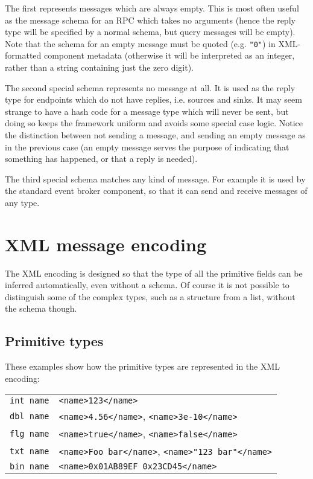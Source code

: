 \documentclass[12pt,a4paper,twoside]{article}
\renewcommand{\_}{\texttt{\symbol{95}}}
\begin{document}
The first represents messages which are always empty.
This is most often useful as the message schema for an RPC which
takes no arguments (hence the reply type will be specified by a normal
schema, but query messages will be empty). Note that the schema
for an empty message must be quoted (e.g. \verb^"0"^) in XML-formatted
component metadata (otherwise it will be interpreted as an integer,
rather than a string containing just the zero digit).

The second special schema represents no message at all. It is used
as the reply type for endpoints which do not have replies, i.e.
sources and sinks. It may seem strange to have a hash code for a
message type which will never be sent, but doing so keeps the
framework uniform and avoids some special case logic. Notice the
distinction between not sending a message, and sending an empty
message as in the previous case (an empty message serves the purpose
of indicating that something has happened, or that a reply is
needed).

The third special schema matches any kind of message. For example
it is used by the standard event broker component, so that it can
send and receive messages of any type.

\newpage
\section{XML message encoding}

The XML encoding is designed so that the type of all the primitive fields
can be inferred automatically, even without a schema. Of course it is
not possible to distinguish some of the complex types, such as a
structure from a list, without the schema though.

\subsection{Primitive types}

These examples show how the primitive types are represented
in the XML encoding:

\begin{tabular}{l|l}
\verb^int name^ & \verb^<name>123</name>^\\
\verb^dbl name^ & \verb^<name>4.56</name>^, \verb^<name>3e-10</name>^\\
\verb^flg name^ & \verb^<name>true</name>^, \verb^<name>false</name>^\\
\verb^txt name^ & \verb^<name>Foo bar</name>^, \verb^<name>"123 bar"</name>^\\
\verb^bin name^ & \verb^<name>0x01AB89EF 0x23CD45</name>^\\
\end{tabular}
\end{document}
